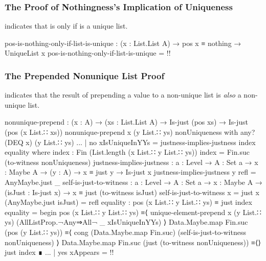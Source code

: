 \documentclass{report}
\begin{document}
\subsubsection{The Proof of Nothingness's Implication of Uniqueness}
 indicates that   is  only if  is a unique list.

\begin{code}
    pos-is-nothing-only-if-list-is-unique :
      (x : List.List A) →
      pos x ≡ nothing →
      UniqueList x
    pos-is-nothing-only-if-list-is-unique = {!!}
\end{code}

\subsubsection{The Prepended Nonunique List Proof}
 indicates that the result of prepending a value to a non-unique list is \emph{also} a non-unique list.

\begin{code}
    nonunique-prepend :
      (x : A) →
      (xs : List.List A) →
      Is-just (pos xs) →
      Is-just (pos (x List.∷ xs))
    nonunique-prepend x (y List.∷ ys) nonUniqueness with any? (DEQ x) (y List.∷ ys)
    ... | no xIsUniqueInYYs = justness-implies-justness index equality
      where
      index : Fin (List.length (x List.∷ y List.∷ ys))
      index = Fin.suc (to-witness nonUniqueness)
      justness-implies-justness :
        {a : Level} →
        {A : Set a} →
        {x : Maybe A} →
        (y : A) →
        x ≡ just y →
        Is-just x
      justness-implies-justness y refl = AnyMaybe.just _
      self-is-just-to-witness :
        {a : Level} →
        {A : Set a} →
        {x : Maybe A} →
        (isJust : Is-just x) →
        x ≡ just (to-witness isJust)
      self-is-just-to-witness {x = just x} (AnyMaybe.just isJust) = refl
      equality : pos (x List.∷ y List.∷ ys) ≡ just index
      equality = begin
        pos (x List.∷ y List.∷ ys)
          ≡⟨ unique-element-prepend x (y List.∷ ys)
                                    (AllListProp.¬Any⇒All¬ _ xIsUniqueInYYs) ⟩
        Data.Maybe.map Fin.suc (pos (y List.∷ ys))
          ≡⟨ cong (Data.Maybe.map Fin.suc) (self-is-just-to-witness nonUniqueness) ⟩
        Data.Maybe.map Fin.suc (just (to-witness nonUniqueness))
          ≡⟨⟩
        just index ∎
    ... | yes xAppears = {!!}
\end{code}
\end{document}

